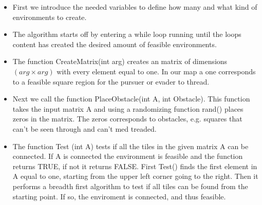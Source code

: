 \begin{itemize}
\item First we introduce the needed variables to define how many and what kind of environments to create. 
\item The algorithm starts off by entering a while loop running until the loops content has created the desired amount of feasible environments. 
\item The function CreateMatrix(int arg) creates an matrix of dimensions $(arg \times arg)$ with every element equal to one. In our map a one corresponds to a feasible square region for the pursuer or evader to thread. 
\item Next we call the function PlaceObstacle(int A, int Obstacle). This function takes the input matrix A and using a randomizing function rand() places zeros in the matrix. The zeros corresponds to obstacles, e.g. squares that can't be seen through and can't med treaded.
\item The function Test (int A) tests if all the tiles in the given matrix A can be connected. If A is connected the environment is feasible and the function returns TRUE, if not it returns FALSE. First Test() finds the first element in A equal to one, starting from the upper left corner going to the right. Then it performs a breadth first algorithm to test if all tiles can be found from the starting point. If so, the enviroment is connected, and thus feasible.
\end{itemize}
